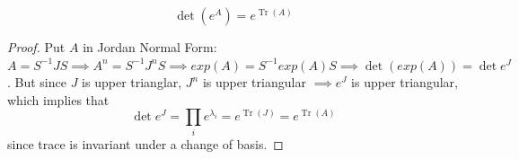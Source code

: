 \documentclass{article}
\DeclareMathOperator{\Tr}{Tr}
\begin{document}
      \begin{proposition}
        \begin{equation}
          \det{(e^A)} = e^{\Tr{(A)}}
        \end{equation}
      \end{proposition}
      \begin{proof}
        Put $A$ in Jordan Normal Form: $A = S^{-1} J S \implies A^n = S^{-1} J^n S \implies exp(A) = S^{-1} exp(A) S \implies \det{(exp(A))} = \det{e^J}$. But since $J$ is upper trianglar, $J^n$ is upper triangular $\implies e^J$ is upper triangular, which implies that 
        \begin{equation}
          \det{e^J} = \prod_i e^{\lambda_i} = e^{\Tr{(J)}} = e^{\Tr{(A)}}
        \end{equation}
        since trace is invariant under a change of basis. 
      \end{proof}
\end{document}
